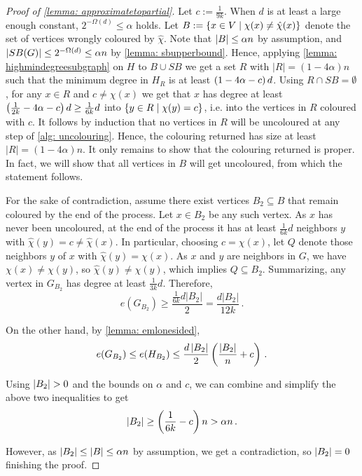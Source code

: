 \begin{proof}[Proof of \cref{lemma: approximatetopartial}]
    Let $c:=\frac{1}{9k}$. When $d$ is at least a large enough constant, $2^{-\Omega(d)}\leq \alpha$ holds. Let $B:=\left\{x\in V\mid \chi(x)\neq \hat{\chi}(x)\right\}$ denote the set of vertices wrongly coloured by $\hat{\chi}$. Note that $\left\lvert B\right\rvert\leq \alpha n$ by assumption, and $\left\lvert SB(G)\right\rvert\leq 2^{-\Omega(d)}\leq \alpha n$ by \cref{lemma: sbupperbound}. Hence, applying \cref{lemma: highmindegreesubgraph} on $H$ to $B\cup SB$ we get a set $R$ with $|R|=(1-4\alpha)n$ such that the minimum degree in $H_R$ is at least $\left(1-4\alpha-c\right)d$. Using $R\cap SB=\emptyset$, for any $x\in R$ and $c\neq \chi(x)$ we get that $x$ has degree at least $\left(\frac{1}{2k}-4\alpha-c\right)d\geq \frac{1}{6k}d$ into $\left\{y\in R\mid \chi(y)=c\right\}$, i.e. into the vertices in $R$ coloured with $c$. It follows by induction that no vertices in $R$ will be uncoloured at any step of \cref{alg: uncolouring}. Hence, the colouring returned has size at least $|R|=(1-4\alpha)n$. It only remains to show that the colouring returned is proper. In fact, we will show that all vertices in $B$ will get uncoloured, from which the statement follows.

    For the sake of contradiction, assume there exist vertices $B_2\subseteq B$ that remain coloured by the end of the process. Let $x\in B_2$ be any such vertex. As $x$ has never been uncoloured, at the end of the process it has at least $\frac{1}{6k}d$ neighbors $y$ with $\hat{\chi}(y)=c\neq \hat{\chi}(x)$. In particular, choosing $c=\chi(x)$, let $Q$ denote those neighbors $y$ of $x$ with $\hat{\chi}(y)=\chi(x)$. As $x$ and $y$ are neighbors in $G$, we have $\chi(x)\neq \chi(y)$, so $\hat{\chi}(y)\neq \chi(y)$, which implies $Q\subseteq B_2$. Summarizing, any vertex in $G_{B_2}$ has degree at least $\frac{1}{3k}d$. Therefore, $$e(G_{B_2})\geq \frac{\frac{1}{6k}d|B_2|}{2}= \frac{d|B_2|}{12k}\,.$$

    On the other hand, by \cref{lemma: emlonesided}, $$e(G_{B_2})\leq e(H_{B_2})\leq \frac{d\left\lvert B_2\right\rvert}{2}\left(\frac{\left\lvert B_2\right\rvert}{n}+c\right)\,.$$
    
    Using $\left\lvert B_2\right\rvert>0$ and the bounds on $\alpha$ and $c$, we can combine and simplify the above two inequalities to get $$\left\lvert B_2\right\rvert\geq \left(\frac{1}{6k}-c\right)n> \alpha n\,.$$

    However, as $\left\lvert B_2\right\rvert\leq \left\lvert B\right\rvert\leq \alpha n$ by assumption, we get a contradiction, so $\left\lvert B_2\right\rvert=0$ finishing the proof.
\end{proof}

